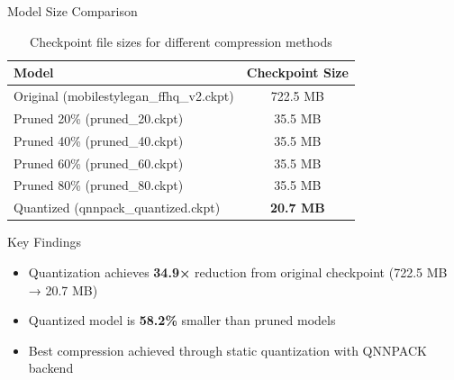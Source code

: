 \documentclass[aspectratio=169,xcolor=dvipsnames]{beamer}
\begin{document}
\begin{frame}{Model Size Comparison}
    \begin{table}
        \centering
        \footnotesize
        \begin{tabular}{l c}
            \toprule
            \textbf{Model} & \textbf{Checkpoint Size} \\
            \midrule
            Original (mobilestylegan\_ffhq\_v2.ckpt) & 722.5 MB \\
            Pruned 20\% (pruned\_20.ckpt) & 35.5 MB \\
            Pruned 40\% (pruned\_40.ckpt) & 35.5 MB \\
            Pruned 60\% (pruned\_60.ckpt) & 35.5 MB \\
            Pruned 80\% (pruned\_80.ckpt) & 35.5 MB \\
            Quantized (qnnpack\_quantized.ckpt) & \textbf{20.7 MB} \\
            \bottomrule
        \end{tabular}
        \caption{Checkpoint file sizes for different compression methods}
    \end{table}
    
    \vspace{0.3cm}
    
    \begin{block}{Key Findings}
        \begin{itemize}
            \item Quantization achieves \textbf{34.9×} reduction from original checkpoint (722.5 MB → 20.7 MB)
            \item Quantized model is \textbf{58.2\%} smaller than pruned models
            \item Best compression achieved through static quantization with QNNPACK backend
        \end{itemize}
    \end{block}
\end{frame}
\end{document}
